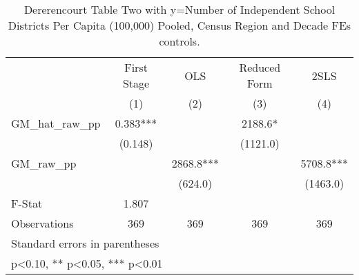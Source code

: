 \begin{table}[htbp]\centering
\def\sym#1{\ifmmode^{#1}\else\(^{#1}\)\fi}
\caption{Dererencourt Table Two with y=Number of Independent School Districts Per Capita (100,000) Pooled, Census Region and Decade FEs controls.}
\begin{tabular}{l*{4}{c}}
\toprule
                    & First Stage   &         OLS   &Reduced Form   &        2SLS   \\
                    &\multicolumn{1}{c}{(1)}   &\multicolumn{1}{c}{(2)}   &\multicolumn{1}{c}{(3)}   &\multicolumn{1}{c}{(4)}   \\
\midrule
GM\_hat\_raw\_pp       &       0.383***&               &      2188.6*  &               \\
                    &     (0.148)   &               &    (1121.0)   &               \\
\addlinespace
GM\_raw\_pp           &               &      2868.8***&               &      5708.8***\\
                    &               &     (624.0)   &               &    (1463.0)   \\
\midrule
F-Stat              &       1.807   &               &               &               \\
Observations        &         369   &         369   &         369   &         369   \\
\bottomrule
\multicolumn{5}{l}{\footnotesize Standard errors in parentheses}\\
\multicolumn{5}{l}{\footnotesize * p<0.10, ** p<0.05, *** p<0.01}\\
\end{tabular}
\end{table}
